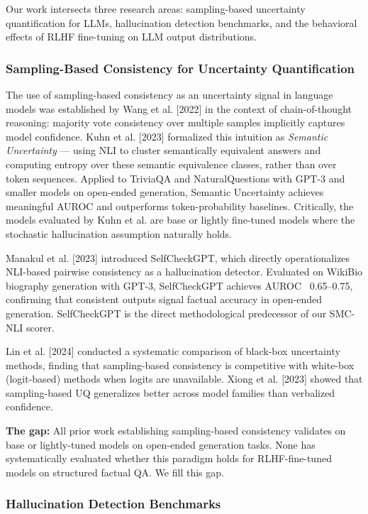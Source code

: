 
Our work intersects three research areas: sampling-based uncertainty quantification for LLMs, hallucination detection benchmarks, and the behavioral effects of RLHF fine-tuning on LLM output distributions.

\subsubsection{Sampling-Based Consistency for Uncertainty Quantification}

The use of sampling-based consistency as an uncertainty signal in language models was established by Wang et al. [2022] in the context of chain-of-thought reasoning: majority vote consistency over multiple samples implicitly captures model confidence. Kuhn et al. [2023] formalized this intuition as \textit{Semantic Uncertainty} --- using NLI to cluster semantically equivalent answers and computing entropy over these semantic equivalence classes, rather than over token sequences. Applied to TriviaQA and NaturalQuestions with GPT-3 and smaller models on open-ended generation, Semantic Uncertainty achieves meaningful AUROC and outperforms token-probability baselines. Critically, the models evaluated by Kuhn et al. are base or lightly fine-tuned models where the stochastic hallucination assumption naturally holds.

Manakul et al. [2023] introduced SelfCheckGPT, which directly operationalizes NLI-based pairwise consistency as a hallucination detector. Evaluated on WikiBio biography generation with GPT-3, SelfCheckGPT achieves AUROC ~0.65--0.75, confirming that consistent outputs signal factual accuracy in open-ended generation. SelfCheckGPT is the direct methodological predecessor of our SMC-NLI scorer.

Lin et al. [2024] conducted a systematic comparison of black-box uncertainty methods, finding that sampling-based consistency is competitive with white-box (logit-based) methods when logits are unavailable. Xiong et al. [2023] showed that sampling-based UQ generalizes better across model families than verbalized confidence.

\textbf{The gap:} All prior work establishing sampling-based consistency validates on base or lightly-tuned models on open-ended generation tasks. None has systematically evaluated whether this paradigm holds for RLHF-fine-tuned models on structured factual QA. We fill this gap.

\subsubsection{Hallucination Detection Benchmarks}

